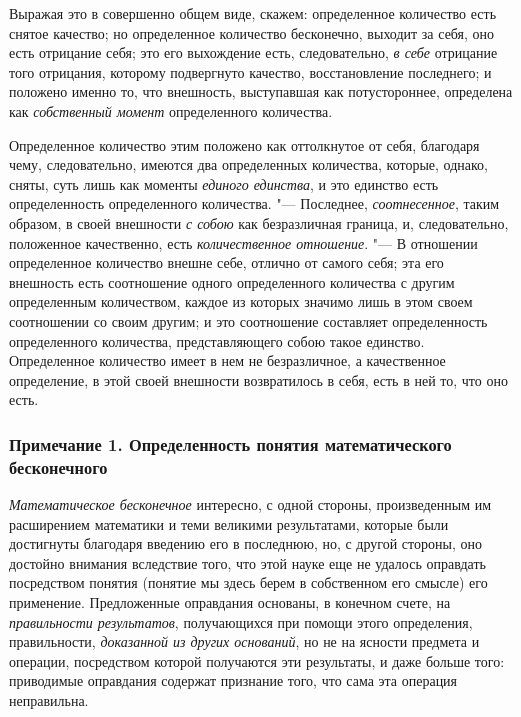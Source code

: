 Выражая это в совершенно общем виде, скажем: определенное количество есть
снятое качество; но определенное количество бесконечно, выходит за себя,
оно есть отрицание себя; это его выхождение есть, следовательно,
{\em в себе} отрицание того отрицания, которому
подвергнуто качество, восстановление последнего; и положено именно то, что
внешность, выступавшая как потустороннее, определена как
{\em собственный момент} определенного количества.

Определенное количество этим положено как оттолкнутое от себя, благодаря
чему, следовательно, имеются два определенных количества, которые, однако,
сняты, суть лишь как моменты {\em единого единства}, и
это единство есть определенность определенного количества. "--- Последнее,
{\em соотнесенное}, таким образом, в своей внешности
{\em с собою} как безразличная граница, и,
следовательно, положенное качественно, есть
{\em количественное отношение}. "--- В отношении
определенное количество внешне себе, отлично от самого себя; эта его
внешность есть соотношение одного определенного количества с другим
определенным количеством, каждое из которых значимо лишь в этом своем
соотношении со своим другим; и это соотношение составляет определенность
определенного количества, представляющего собою такое единство.
Определенное количество имеет в нем не безразличное, а качественное
определение, в этой своей внешности возвратилось в себя, есть в ней то, что
оно есть.

\subsubsection[Примечание 1. Определенность понятия математического бесконечного]
{Примечание 1. Определенность понятия математического бесконечного}

{\em Математическое бесконечное} интересно, с одной
стороны, произведенным им расширением математики и теми великими
результатами, которые были достигнуты благодаря введению его в последнюю,
но, с другой стороны, оно достойно внимания вследствие того, что этой науке
еще не удалось оправдать посредством понятия (понятие мы здесь берем в
собственном его смысле) его применение. Предложенные оправдания основаны, в
конечном счете, на {\em правильности результатов},
получающихся при помощи этого определения, правильности,
{\em доказанной из других оснований}, но не на ясности
предмета и операции, посредством которой получаются эти результаты, и даже
больше того: приводимые оправдания содержат признание того, что сама эта
операция неправильна.

